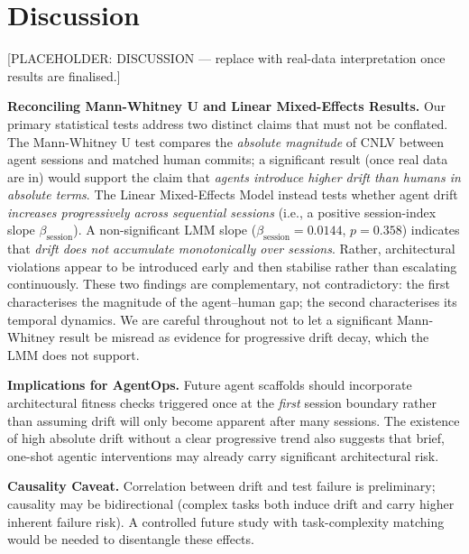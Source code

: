 \documentclass[11pt]{article}
\begin{document}

\section{Discussion}
\label{sec:discussion}

[PLACEHOLDER: DISCUSSION — replace with real-data interpretation once
results are finalised.]

\textbf{Reconciling Mann-Whitney U and Linear Mixed-Effects Results.}
Our primary statistical tests address two distinct claims that must not
be conflated. The Mann-Whitney U test compares the \emph{absolute
magnitude} of CNLV between agent sessions and matched human commits;
a significant result (once real data are in) would support the claim
that \emph{agents introduce higher drift than humans in absolute terms}.
The Linear Mixed-Effects Model instead tests whether agent drift
\emph{increases progressively across sequential sessions} (i.e., a
positive session-index slope $\beta_{\text{session}}$). A
non-significant LMM slope ($\beta_{\mathrm{session}} = 0.0144$,
$p = 0.358$) indicates that
\emph{drift does not accumulate monotonically over sessions}. Rather,
architectural violations appear to be introduced early and then
stabilise rather than escalating continuously. These two findings are
complementary, not contradictory: the first characterises the
magnitude of the agent--human gap; the second characterises its
temporal dynamics. We are careful throughout not to let a significant
Mann-Whitney result be misread as evidence for progressive drift decay,
which the LMM does not support.

\textbf{Implications for AgentOps.}
Future agent scaffolds should incorporate architectural fitness
checks triggered once at the \emph{first} session boundary rather than
assuming drift will only become apparent after many sessions. The
existence of high absolute drift without a clear progressive trend also
suggests that brief, one-shot agentic interventions may already carry
significant architectural risk.

\textbf{Causality Caveat.}
Correlation between drift and test failure is preliminary; causality may
be bidirectional (complex tasks both induce drift and carry higher
inherent failure risk). A controlled future study with task-complexity
matching would be needed to disentangle these effects.

\end{document}
